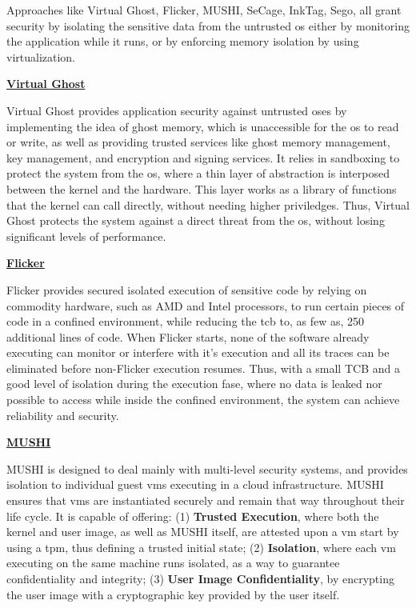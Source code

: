 Approaches like Virtual Ghost, Flicker, MUSHI, SeCage, InkTag, Sego, all grant security by isolating the sensitive data from the untrusted \gls{os} either by monitoring the application while it runs, or by enforcing memory isolation by using virtualization.\newline


\underline{\textbf{Virtual Ghost}}  

Virtual Ghost \cite{virtGhostPaper} provides application security against untrusted \gls{os}es by implementing the idea of ghost memory, which is unaccessible for the \gls{os} to read or write, as well as providing trusted services like ghost memory management, key management, and encryption and signing services. 
It relies in sandboxing to protect the system from the \gls{os}, where a thin layer of abstraction is interposed between the kernel and the hardware. This layer works as a library of functions that the kernel can call directly, without needing higher priviledges. 
Thus, Virtual Ghost protects the system against a direct threat from the \gls{os}, without losing significant levels of performance.\newline


\underline{\textbf{Flicker}}

Flicker \cite{flickerPaper} provides secured isolated execution of sensitive code by relying on commodity hardware, such as AMD and Intel processors, to run certain pieces of code in a confined environment, while reducing the \gls{tcb} to, as few as, 250 additional lines of code. 
When Flicker starts, none of the software already executing can monitor or interfere with it’s execution and all its traces can be eliminated before non-Flicker execution resumes. 
Thus, with a small TCB and a good level of isolation during the execution fase, where no data is leaked nor possible to access while inside the confined environment, the system can achieve reliability and security.\newline


\underline{\textbf{MUSHI}}

MUSHI \cite{mushiPaper} is designed to deal mainly with multi-level security systems, and provides isolation to individual guest \gls{vm}s executing in a cloud infrastructure. MUSHI ensures that \gls{vm}s are instantiated securely and remain that way throughout their life cycle. 
It is capable of offering: (1) \textbf{Trusted Execution}, where both the kernel and user image, as well as MUSHI itself, are attested upon a \gls{vm} start by using a \gls{tpm}, thus defining a trusted initial state; (2) \textbf{Isolation}, where each \gls{vm} executing on the same machine runs isolated, as a way to guarantee confidentiality and integrity; (3) \textbf{User Image Confidentiality}, by encrypting the user image with a cryptographic key provided by the user itself.

